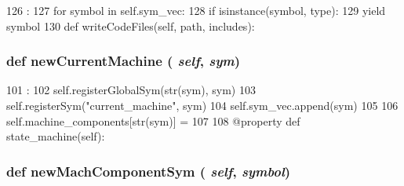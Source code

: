 \begin{DoxyCode}
126                               :
127         for symbol in self.sym_vec:
128             if isinstance(symbol, type):
129                 yield symbol
130 
    def writeCodeFiles(self, path, includes):
\end{DoxyCode}
\hypertarget{classslicc_1_1symbols_1_1SymbolTable_1_1SymbolTable_a4bd012ae0d4d6660f4318e968d61ca05}{
\subsubsection[{newCurrentMachine}]{\setlength{\rightskip}{0pt plus 5cm}def newCurrentMachine ( {\em self}, \/   {\em sym})}}
\label{classslicc_1_1symbols_1_1SymbolTable_1_1SymbolTable_a4bd012ae0d4d6660f4318e968d61ca05}



\begin{DoxyCode}
101                                     :
102         self.registerGlobalSym(str(sym), sym)
103         self.registerSym("current_machine", sym)
104         self.sym_vec.append(sym)
105 
106         self.machine_components[str(sym)] = {}
107 
108     @property
    def state_machine(self):
\end{DoxyCode}
\hypertarget{classslicc_1_1symbols_1_1SymbolTable_1_1SymbolTable_af72d1c1bd8f92a5eb722eba7835c5b49}{
\subsubsection[{newMachComponentSym}]{\setlength{\rightskip}{0pt plus 5cm}def newMachComponentSym ( {\em self}, \/   {\em symbol})}}
\label{classslicc_1_1symbols_1_1SymbolTable_1_1SymbolTable_af72d1c1bd8f92a5eb722eba7835c5b49}



